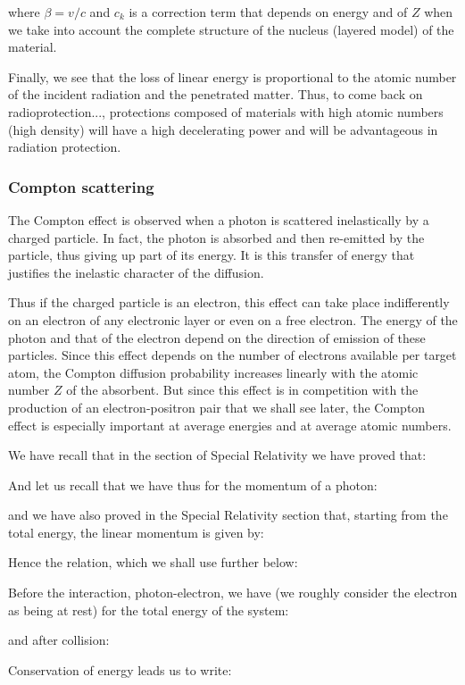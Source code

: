 	where $\beta=v/c$ and $c_k$ is a correction term that depends on energy and of $Z$ when we take into account the complete structure of the nucleus (layered model) of the material.

	Finally, we see that the loss of linear energy is proportional to the atomic number of the incident radiation and the penetrated matter. Thus, to come back on radioprotection..., protections composed of materials with high atomic numbers (high density) will have a high decelerating power and will be advantageous in radiation protection.
	
	\subsubsection{Compton scattering}\label{compton scattering}
	The Compton effect is observed when a photon is scattered inelastically by a charged particle. In fact, the photon is absorbed and then re-emitted by the particle, thus giving up part of its energy. It is this transfer of energy that justifies the inelastic character of the diffusion.

	Thus if the charged particle is an electron, this effect can take place indifferently on an electron of any electronic layer or even on a free electron. The energy of the photon and that of the electron depend on the direction of emission of these particles. Since this effect depends on the number of electrons available per target atom, the Compton diffusion probability increases linearly with the atomic number $Z$ of the absorbent. But since this effect is in competition with the production of an electron-positron pair that we shall see later, the Compton effect is especially important at average energies and at average atomic numbers.

	We have recall that in the section of Special Relativity we have proved that:
	
	And let us recall that we have thus for the momentum of a photon:
	
	and we have also proved in the Special Relativity section that, starting from the total energy, the linear momentum is given by:
	
	Hence the relation, which we shall use further below:
	
	Before the interaction, photon-electron, we have (we roughly consider the electron as being at rest) for the total energy of the system:
	
	and after collision:
	
	Conservation of energy leads us to write:
	
